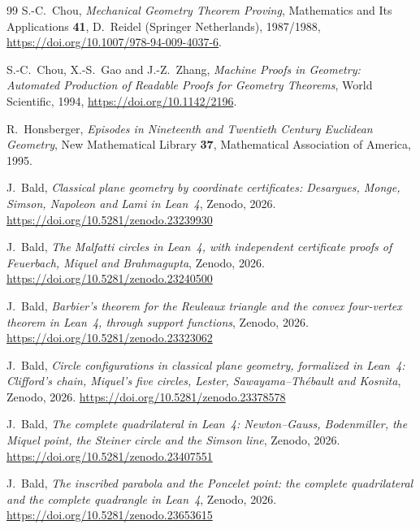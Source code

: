 \documentclass[11pt]{article}
\theoremstyle{definition}
\theoremstyle{remark}
\begin{document}
\begin{thebibliography}{99}
S.-C.~Chou, \emph{Mechanical Geometry Theorem Proving}, Mathematics and Its Applications \textbf{41},
D.~Reidel (Springer Netherlands), 1987/1988, \url{https://doi.org/10.1007/978-94-009-4037-6}.

S.-C.~Chou, X.-S.~Gao and J.-Z.~Zhang, \emph{Machine Proofs in Geometry: Automated Production of
Readable Proofs for Geometry Theorems}, World Scientific, 1994, \url{https://doi.org/10.1142/2196}.

R.~Honsberger,
\emph{Episodes in Nineteenth and Twentieth Century Euclidean Geometry},
New Mathematical Library \textbf{37}, Mathematical Association of America, 1995.

J.~Bald,
\emph{Classical plane geometry by coordinate certificates: Desargues, Monge, Simson, Napoleon and Lami in Lean~4},
Zenodo, 2026. \url{https://doi.org/10.5281/zenodo.23239930}

J.~Bald,
\emph{The Malfatti circles in Lean~4, with independent certificate proofs of Feuerbach, Miquel and Brahmagupta},
Zenodo, 2026. \url{https://doi.org/10.5281/zenodo.23240500}

J.~Bald,
\emph{Barbier's theorem for the Reuleaux triangle and the convex four-vertex theorem in Lean~4, through support functions},
Zenodo, 2026. \url{https://doi.org/10.5281/zenodo.23323062}

J.~Bald,
\emph{Circle configurations in classical plane geometry, formalized in Lean~4: Clifford's chain, Miquel's five circles, Lester, Sawayama--Th\'ebault and Kosnita},
Zenodo, 2026. \url{https://doi.org/10.5281/zenodo.23378578}

J.~Bald,
\emph{The complete quadrilateral in Lean~4: Newton--Gauss, Bodenmiller, the Miquel point, the Steiner circle and the Simson line},
Zenodo, 2026. \url{https://doi.org/10.5281/zenodo.23407551}

J.~Bald,
\emph{The inscribed parabola and the Poncelet point: the complete quadrilateral and the complete quadrangle in Lean~4},
Zenodo, 2026. \url{https://doi.org/10.5281/zenodo.23653615}
\end{thebibliography}
\end{document}
